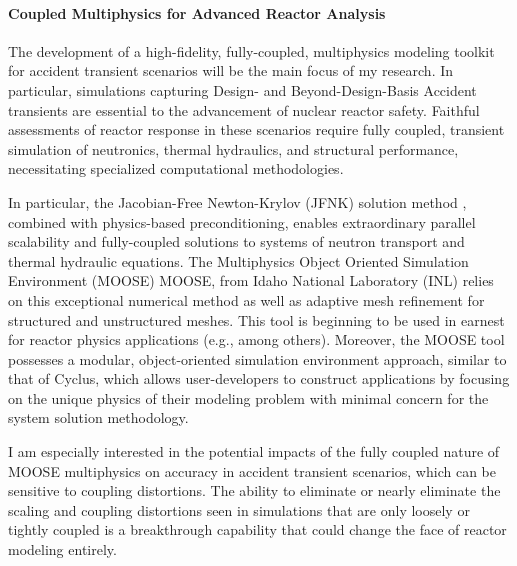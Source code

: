 \documentclass[a4paper, 10pt]{article}
\begin{document}


\paragraph{Coupled Multiphysics for Advanced Reactor Analysis}

The development of a high-fidelity, fully-coupled, multiphysics modeling toolkit 
for accident transient scenarios will be the main focus of my research. In 
particular, simulations capturing Design- and Beyond-Design-Basis Accident 
transients are essential to the advancement of nuclear reactor safety. Faithful 
assessments of reactor response in these scenarios require fully coupled, 
transient simulation of neutronics, thermal hydraulics, and structural 
performance, necessitating specialized computational methodologies.  


In particular, the Jacobian-Free Newton-Krylov (JFNK) solution method 
\cite{knoll_jacobian-free_2004}, combined with 
physics-based preconditioning, enables extraordinary parallel scalability
and fully-coupled solutions to systems of neutron transport and thermal 
hydraulic equations. The Multiphysics 
Object Oriented Simulation Environment (MOOSE) \cite{gaston_moose:_2009} MOOSE, 
from Idaho National Laboratory (INL) relies on this exceptional numerical 
method as well as adaptive mesh refinement for structured and 
unstructured meshes. This tool is beginning to be used in earnest for reactor physics 
applications (e.g., \cite{park_tightly_2009, short_multiphysics_2013, 
novascone_assessment_2012, novascone_multidimensional_2012, 
gaston_parallel_2009} among others). Moreover, the MOOSE tool possesses a 
modular, object-oriented simulation environment approach, similar to that of 
Cyclus, which allows user-developers to construct applications by focusing on 
the unique physics of their modeling problem  with minimal concern for the 
system solution methodology. 

I am especially interested in the potential impacts of the fully coupled 
nature of MOOSE multiphysics on accuracy in accident transient scenarios, which 
can be sensitive to coupling distortions. The ability to eliminate or nearly 
eliminate the scaling and coupling distortions seen in simulations that are only 
loosely or tightly coupled is a breakthrough capability that could change the 
face of reactor modeling entirely.  
\end{document}
